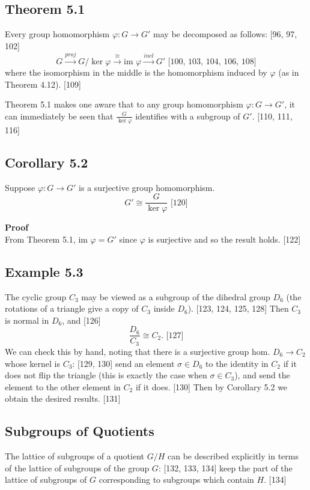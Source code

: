 \subsection*{Theorem 5.1}
Every group homomorphism $\varphi: G \to G'$ may be decomposed as follows: [96, 97, 102]
$$G \xrightarrow{proj} G/\ker \varphi \xrightarrow{\cong} \text{im } \varphi \xrightarrow{incl} G' \text{ [100, 103, 104, 106, 108]}$$
where the isomorphism in the middle is the homomorphism induced by $\varphi$ (as in Theorem 4.12). [109]

Theorem 5.1 makes one aware that to any group homomorphism $\varphi: G \to G'$, it can immediately be seen that $\frac{G}{\ker \varphi}$ identifies with a subgroup of $G'$. [110, 111, 116]

\subsection*{Corollary 5.2}
Suppose $\varphi: G \to G'$ is a surjective group homomorphism.
$$G' \cong \frac{G}{\ker \varphi} \text{ [120]}$$

\textbf{Proof} \\
From Theorem 5.1, $\text{im } \varphi = G'$ since $\varphi$ is surjective and so the result holds. [122]

\subsection*{Example 5.3}
The cyclic group $C_3$ may be viewed as a subgroup of the dihedral group $D_6$ (the rotations of a triangle give a copy of $C_3$ inside $D_6$). [123, 124, 125, 128] Then $C_3$ is normal in $D_6$, and [126]
$$\frac{D_6}{C_3} \cong C_2. \text{ [127]}$$
We can check this by hand, noting that there is a surjective group hom. $D_6 \to C_2$ whose kernel is $C_3$: [129, 130] send an element $\sigma \in D_6$ to the identity in $C_2$ if it does not flip the triangle (this is exactly the case when $\sigma \in C_3$), and send the element to the other element in $C_2$ if it does. [130] Then by Corollary 5.2 we obtain the desired results. [131]

\subsection*{Subgroups of Quotients}
The lattice of subgroups of a quotient $G/H$ can be described explicitly in terms of the lattice of subgroups of the group $G$: [132, 133, 134] keep the part of the lattice of subgroups of $G$ corresponding to subgroups which contain $H$. [134]

